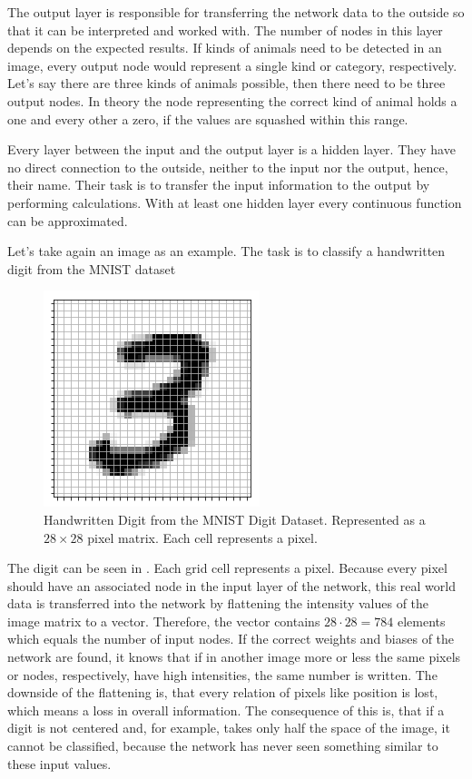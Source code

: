 The output layer is responsible for transferring the network data to the outside so that it can be interpreted and worked with.
The number of nodes in this layer depends on the expected results.
If kinds of animals need to be detected in an image, every output node would represent a single kind or category, respectively.
Let's say there are three kinds of animals possible, then there need to be three output nodes.
In theory the node representing the correct kind of animal holds a one and every other a zero, if the values are squashed within this range.

Every layer between the input and the output layer is a hidden layer.
They have no direct connection to the outside, neither to the input nor the output, hence, their name.
Their task is to transfer the input information to the output by performing calculations.
With at least one hidden layer every continuous function can be approximated.

Let's take again an image as an example.
The task is to classify a handwritten digit from the MNIST dataset\cite{Lecun98}
\begin{figure}
	\centering
	\includegraphics{images/mnist-digit}
	\caption[Handwritten Digit from the MNIST Digit Dataset]{Handwritten Digit from the MNIST Digit Dataset. Represented as a $28 \times 28$ pixel matrix. Each cell represents a pixel.}
	\label{fig:mnist-digit}
\end{figure}
The digit can be seen in .
Each grid cell represents a pixel.
Because every pixel should have an associated node in the input layer of the network, this real world data is transferred into the network by flattening the intensity values of the image matrix to a vector.
Therefore, the vector contains $28 \cdot 28 = 784$ elements which equals the number of input nodes.
If the correct weights and biases of the network are found, it knows that if in another image more or less the same pixels or nodes, respectively, have high intensities, the same number is written.
The downside of the flattening is, that every relation of pixels like position is lost, which means a loss in overall information.
The consequence of this is, that if a digit is not centered and, for example, takes only half the space of the image, it cannot be classified, because the network has never seen something similar to these input values.
